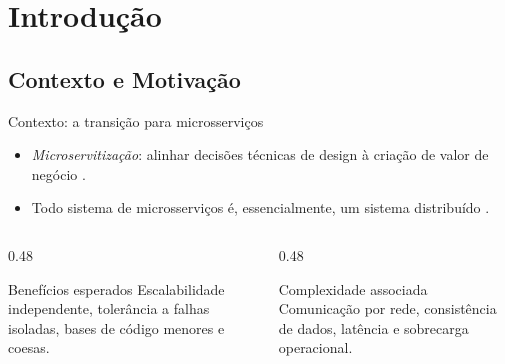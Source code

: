 

\section[Introdução]{Introdução}
\label{sec:introducao}

\subsection{Contexto e Motivação}
\label{subsec:contexto}

\begin{frame}{Contexto: a transição para microsserviços}
    \begin{itemize}
        \item \emph{Microservitização}: alinhar decisões técnicas de design à criação de valor de negócio \cite{hassan2020microservice}.
        \item Todo sistema de microsserviços é, essencialmente, um sistema distribuído \cite{dragoni2018microservices}.
    \end{itemize}
    \vfill
    \begin{columns}[T]
        \begin{column}{0.48\textwidth}
            \begin{exampleblock}{Benefícios esperados}
                \small Escalabilidade independente, tolerância a falhas isoladas, bases de código menores e coesas.
            \end{exampleblock}
        \end{column}
        \begin{column}{0.48\textwidth}
            \begin{alertblock}{Complexidade associada}
                \small Comunicação por rede, consistência de dados, latência e sobrecarga operacional.
            \end{alertblock}
        \end{column}
    \end{columns}
\end{frame}


